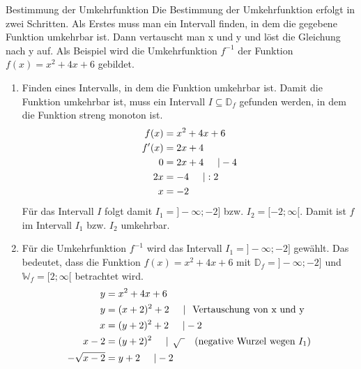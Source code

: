\begin{b8d}{Bestimmung der Umkehrfunktion}{}
Die Bestimmung der Umkehrfunktion erfolgt in zwei Schritten. Als Erstes muss man ein Intervall finden, in dem die gegebene Funktion umkehrbar ist. Dann vertauscht man x und y und löst die Gleichung nach y auf. Als Beispiel wird die Umkehrfunktion $f^{-1}$ der Funktion $f(x) = x^2+4x+6$ gebildet.
\begin{enumerate}
    \item Finden eines Intervalls, in dem die Funktion umkehrbar ist. Damit die Funktion umkehrbar ist, muss ein Intervall $I \subseteq \mathds{D}_f$ gefunden werden, in dem die Funktion streng monoton ist.
    \begin{equation*}
        \begin{split}
            f(x)&= x^2+4x+6 \\
            f'(x)&= 2x+4\\
            0&= 2x+4 \hspace{0.5cm} | -4\\
            2x&= -4 \hspace{0.5cm} | :2\\
            x&= -2
        \end{split}
    \end{equation*}
    Für das Intervall $I$ folgt damit $I_1=]-\infty; -2] $ bzw. $I_2 = [-2;\infty[$. Damit ist $f$ im Intervall $I_1$ bzw. $I_2$ umkehrbar.
    \item Für die Umkehrfunktion $f^{-1}$ wird das Intervall $I_1 = ]-\infty; -2]$ gewählt. Das bedeutet, dass die Funktion $f(x) = x^2+4x+6$ mit $\mathds{D}_f = ]-\infty; -2]$ und $\mathds{W}_f = [2; \infty[$ betrachtet wird.
    \begin{equation*}
        \begin{split}
            y &= x^2+4x+6\\
            y &= (x+2)^2 +2 \hspace{0.5cm}| \hspace{0.25cm} \text{Vertauschung von x und y} \\
            x &= (y+2)^2+2 \hspace{0.5cm}| -2 \\
            x-2 &= (y+2)^2 \hspace{0.5cm}| \hspace{0.15cm}\sqrt{\hspace{0.15cm}} \quad \text{(negative Wurzel wegen } I_1\text{)}\\
            -\sqrt{x-2} &=y+2 \hspace{0.5cm}| -2\\

\end{split}
\end{equation*}
\end{enumerate}
\end{b8d}
